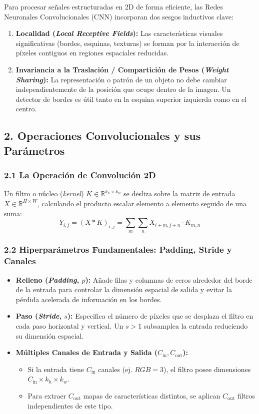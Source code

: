 Para procesar señales estructuradas en 2D de forma eficiente, las Redes Neuronales Convolucionales (CNN) incorporan dos sesgos inductivos clave:

\begin{enumerate}
	\item \textbf{Localidad (\emph{Local Receptive Fields}):} Las características visuales significativas (bordes, esquinas, texturas) se forman por la interacción de píxeles contiguos en regiones espaciales reducidas.
	\item \textbf{Invariancia a la Traslación / Compartición de Pesos (\emph{Weight Sharing}):} La representación o patrón de un objeto no debe cambiar independientemente de la posición que ocupe dentro de la imagen. Un detector de bordes es útil tanto en la esquina superior izquierda como en el centro.
\end{enumerate}

\subsection{2. Operaciones Convolucionales y sus Parámetros}

\subsubsection{2.1 La Operación de Convolución 2D}

Un filtro o núcleo (\emph{kernel}) $K \in \mathbb{R}^{k_h \times k_w}$ se desliza sobre la matriz de entrada $X \in \mathbb{R}^{H \times W}$, calculando el producto escalar elemento a elemento seguido de una suma:
$$Y_{i, j} = (X * K)_{i, j} = \sum_{m} \sum_{n} X_{i+m, j+n} \cdot K_{m, n}$$

\subsubsection{2.2 Hiperparámetros Fundamentales: Padding, Stride y Canales}

\begin{itemize}
	\item \textbf{Relleno (\emph{Padding}, $p$):} Añade filas y columnas de ceros alrededor del borde de la entrada para controlar la dimensión espacial de salida y evitar la pérdida acelerada de información en los bordes.
	
	\item \textbf{Paso (\emph{Stride}, $s$):} Especifica el número de píxeles que se desplaza el filtro en cada paso horizontal y vertical. Un $s > 1$ subsamplea la entrada reduciendo su dimensión espacial.
	
	\item \textbf{Múltiples Canales de Entrada y Salida ($C_{\text{in}}, C_{\text{out}}$):}
	\begin{itemize}
		\item Si la entrada tiene $C_{\text{in}}$ canales (ej. $RGB = 3$), el filtro posee dimensiones $C_{\text{in}} \times k_h \times k_w$.
		\item Para extraer $C_{\text{out}}$ mapas de características distintos, se aplican $C_{\text{out}}$ filtros independientes de este tipo.
	\end{itemize}
\end{itemize}

